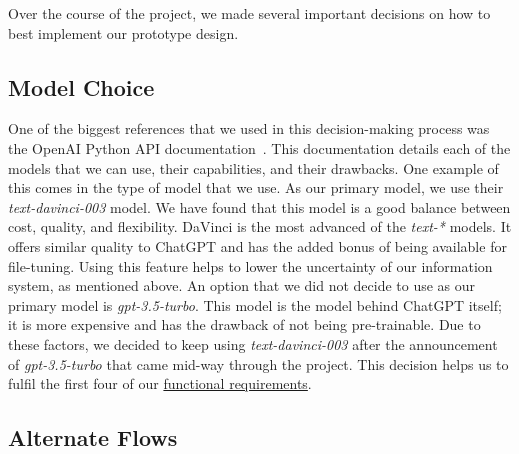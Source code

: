 \documentclass[12pt,a4paper]{article}
\begin{document}
    Over the course of the project, we made several important decisions on how to best implement our
    prototype design.

    \subsection{Model Choice}

    One of the biggest references that we used in this decision-making process was
    the OpenAI Python API documentation~\cite{openAiDocs}.  This documentation details
    each of the models that we can use, their capabilities, and their drawbacks.  One example of this
    comes in the type of model that we use.  As our primary model, we use their \textit{text-davinci-003}
    model.  We have found that this model is a good balance between cost, quality, and flexibility.
    DaVinci is the most advanced of the \textit{text-*} models.  It offers similar quality to ChatGPT
    and has the added bonus of being available for file-tuning.  Using this feature helps to lower
    the uncertainty of our information system, as mentioned above.  An option that we did not decide to
    use as our primary model is \textit{gpt-3.5-turbo}.  This model is the model behind ChatGPT itself;
    it is more expensive and has the drawback of not being pre-trainable.  Due to these factors, we
    decided to keep using \textit{text-davinci-003} after the announcement of \textit{gpt-3.5-turbo}
    that came mid-way through the project.  This decision helps us to fulfil the first four of our
    \hyperref[functionalReqs]{functional requirements}.

    \subsection{Alternate Flows}
\end{document}
